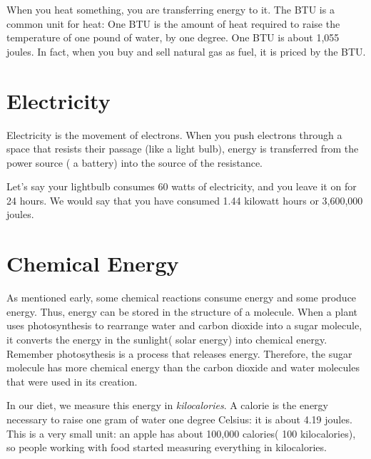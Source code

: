 When you heat something, you are transferring energy to it. The BTU
 is a common unit for heat: One BTU is the
amount of heat required to raise the temperature of one pound of water,
by one degree. One BTU is about 1,055 joules. In fact, when you buy and sell
natural gas as fuel, it is priced by the BTU. 

\section{Electricity}

Electricity is the movement of electrons. When you push electrons
through a space that resists their passage (like a light bulb),
energy is transferred from the power source ( a battery)
 into the source of the resistance.

Let's say your lightbulb consumes 60 watts of electricity, and you leave it on for 24 hours.
We would say that you have consumed 1.44 kilowatt hours or 3,600,000 joules.


\section{Chemical Energy}

As mentioned early, some chemical reactions consume energy and some
produce energy. Thus, energy can be stored in the structure of a
molecule. When a plant uses photosynthesis to rearrange water and
carbon dioxide into a sugar molecule, it converts the energy in
the sunlight( solar energy) into chemical energy. Remember photosythesis is a process that releases energy.
Therefore, the sugar molecule has more chemical energy than the carbon dioxide and water molecules that were
used in its creation.

In our diet, we measure this energy in \textit{kilocalories}. A
calorie is the energy necessary to raise one gram of water one degree
Celsius: it is about 4.19 joules. This is a very small unit: an apple
has about 100,000 calories( 100 kilocalories), so people working with food started
measuring everything in kilocalories.

